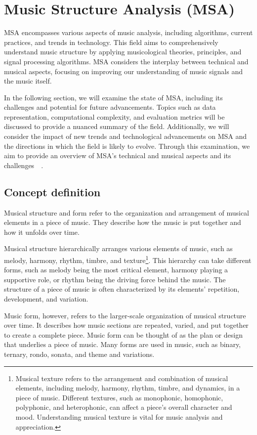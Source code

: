 \chapter{Music Structure Analysis (MSA)}

MSA encompasses various aspects of music analysis, including algorithms, current practices, and trends in technology. This field aims to comprehensively understand music structure by applying musicological theories, principles, and signal processing algorithms. MSA considers the interplay between technical and musical aspects, focusing on improving our understanding of music signals and the music itself.

In the following section, we will examine the state of MSA, including its challenges and potential for future advancements. Topics such as data representation, computational complexity, and evaluation metrics will be discussed to provide a nuanced summary of the field. Additionally, we will consider the impact of new trends and technological advancements on MSA and the directions in which the field is likely to evolve. Through this examination, we aim to provide an overview of MSA's technical and musical aspects and its challenges~\cite{Nieto2020}~\cite{Chaki2021}.

\section{Concept definition}

Musical structure and form refer to the organization and arrangement of musical elements in a piece of music. They describe how the music is put together and how it unfolds over time.

Musical structure hierarchically arranges various elements of music, such as melody, harmony, rhythm, timbre, and texture\footnote{Musical texture refers to the arrangement and combination of musical elements, including melody, harmony, rhythm, timbre, and dynamics, in a piece of music. Different textures, such as monophonic, homophonic, polyphonic, and heterophonic, can affect a piece's overall character and mood. Understanding musical texture is vital for music analysis and appreciation.}. This hierarchy can take different forms, such as melody being the most critical element, harmony playing a supportive role, or rhythm being the driving force behind the music. The structure of a piece of music is often characterized by its elements' repetition, development, and variation.

Music form, however, refers to the larger-scale organization of musical structure over time. It describes how music sections are repeated, varied, and put together to create a complete piece. Music form can be thought of as the plan or design that underlies a piece of music. Many forms are used in music, such as binary, ternary, rondo, sonata, and theme and variations.

